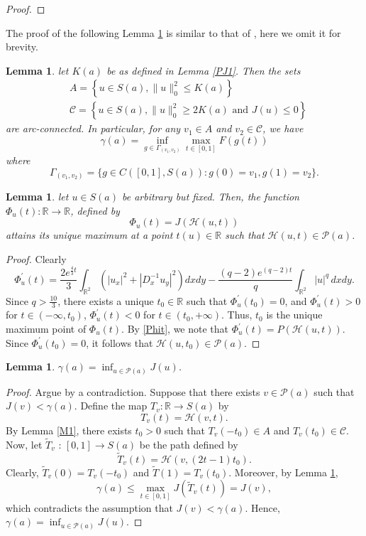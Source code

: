 \documentclass[11pt]{amsart}
\newtheorem{lemma}[theorem]{Lemma}
\numberwithin{equation}{section}
\newcommand\R{\mathbb R}
\begin{document}
{{{\begin{proof}
\end{proof}	
The proof of the following Lemma \ref{arc} is similar to that of \cite[Lemma 2.8]{Jean}, here we omit it for brevity.
\begin{lemma}\label{arc}
    let $K(a)$ be as defined in Lemma \ref{PJ1}. Then the sets
    $$
    \begin{aligned}
        & A=\left\{u \in S(a),\|u\|_0^2 \leq K(a)\right\} \\
        & {\mathcal{C}=\left\{u \in S(a),\| u\|_0^2 \geq 2 K(a) \text { and } J(u) \leq 0\right\}}
    \end{aligned}
    $$
    are arc-connected. In particular, for any $ v_1 \in A$ and $v_2 \in \mathcal{C}$, we have
    $$
    \gamma(a) = \inf_{g \in \Gamma_{(v_1,v_2)}} \max_{t \in [0,1]} F(g(t))
    $$
    where
    $$
    \Gamma_{(v_1, v_2)} = \{g \in C([0,1], S(a)) : g(0) = v_1, g(1) = v_2\}.
    $$
\end{lemma}
\begin{lemma}\label{Phimax}
    let $u \in S(a)$ be arbitrary but fixed. Then, the function $\Phi_u(t): \R \rightarrow \R$, defined by
    \begin{equation}\label{Phit}
        \Phi_u(t)={J}(\mathcal{H}(u, t))
    \end{equation}
    {attains its unique maximum} at a point $t(u) \in \R$ such that $\mathcal{H}(u, t) \in \mathcal{P}(a)$.
\end{lemma}
\begin{proof}
    Clearly
    $$
    \Phi^{'}_u(t)=\frac{2e^{\frac{4}{3}t}}{3}\int_{\mathbb{R}^{2}}\left( |u_{x}|^{2}+|D^{-1}_{x} u_{y}|^{2}\right) dx dy-\frac{(q-2)e^{(q-2)t}}{q}\int_{\mathbb{R}^2} |u|^q \,dxdy.
    $$
    Since $q>\frac{10}{3}$,  there exists a unique $t_0\in \R$ such that
    $\Phi^{'}_u(t_0)=0$, and $\Phi^{'}_u(t)>0$ for $t\in(-\infty,t_0)$, $\Phi^{'}_u(t)<0$ for $t\in(t_0,+\infty)$. Thus, $t_0$ is the  unique maximum point of $    \Phi_u(t) $.
    By \eqref{Phit}, we note that $ \Phi^{'}_u(t)=P(\mathcal{H}(u, t)) $. Since $ \Phi^{'}_u(t_0)=0 $, it follows that $\mathcal{H}(u, t_0)\in\mathcal{P}(a)$.
\end{proof}


\begin{lemma}
    $\gamma(a)=\inf _{u \in\mathcal{P}(a)} J(u)$.
\end{lemma}
\begin{proof}
    Argue by a contradiction. Suppose that there exists $ v \in \mathcal{P}(a)$ such that
    $J(v)<\gamma(a)$. Define the map $T_v: \R \rightarrow S(a)$ by
    $$
    T_v(t)=\mathcal{H}(v, t).
    $$
    {By Lemma \ref{M1}, there exists $t_0>0$ such that $T_v\left(-t_0\right) \in A$ and {$T_v\left(t_0\right) \in \mathcal{C}$}.} Now, let $\tilde{T}_v$ : $[0,1] \rightarrow S(a)$ be the path defined by
    $$
    \tilde{T}_v(t)=\mathcal{H}\left(v,(2 t-1) t_0\right).
    $$
    Clearly, $\tilde{T}_v(0)=T_v\left(-t_0\right)$ and $\tilde{T}(1)=T_v\left(t_0\right)$. Moreover, by Lemma \ref{Phimax},
    $$
    \gamma(a) \leq \max _{t \in[0,1]} J\left(\tilde{T}_v(t)\right)=J(v),
    $$
    which contradicts the assumption that $ J(v)<\gamma(a) $. Hence, $\gamma(a) = \inf_{u \in \mathcal{P}(a)} J(u) $.
\end{proof}

}}}
\end{document}
